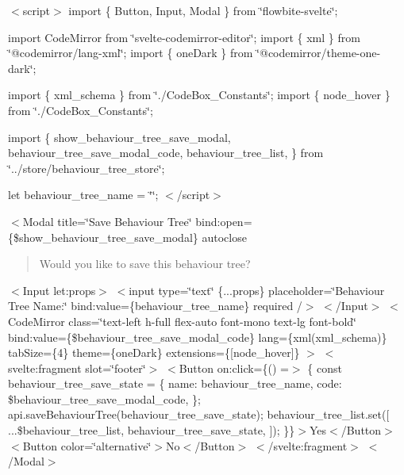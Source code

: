 $<$script$>$ import \{ Button, Input, Modal \} from \char`\"{}flowbite-\/svelte\char`\"{};

import Code\+Mirror from \char`\"{}svelte-\/codemirror-\/editor\char`\"{}; import \{ xml \} from \char`\"{}@codemirror/lang-\/xml\char`\"{}; import \{ one\+Dark \} from \char`\"{}@codemirror/theme-\/one-\/dark\char`\"{};

import \{ xml\+\_\+schema \} from \char`\"{}./\+Code\+Box\+\_\+\+Constants\char`\"{}; import \{ node\+\_\+hover \} from \char`\"{}./\+Code\+Box\+\_\+\+Constants\char`\"{};

import \{ show\+\_\+behaviour\+\_\+tree\+\_\+save\+\_\+modal, behaviour\+\_\+tree\+\_\+save\+\_\+modal\+\_\+code, behaviour\+\_\+tree\+\_\+list, \} from \char`\"{}../store/behaviour\+\_\+tree\+\_\+store\char`\"{};

let behaviour\+\_\+tree\+\_\+name = \char`\"{}\char`\"{}; $<$/script$>$

\texorpdfstring{$<$}{<}Modal title=\char`\"{}\+Save Behaviour Tree\char`\"{} bind\+:open=\{\$show\+\_\+behaviour\+\_\+tree\+\_\+save\+\_\+modal\} autoclose \begin{quote}
 

Would you like to save this behaviour tree? 

\end{quote}
$<$\+Input let\+:props$>$ \texorpdfstring{$<$}{<}input type=\char`\"{}text\char`\"{} \{...props\} placeholder=\char`\"{}\+Behaviour Tree Name\+:\char`\"{} bind\+:value=\{behaviour\+\_\+tree\+\_\+name\} required /\texorpdfstring{$>$}{>} $<$/\+Input$>$ $<$\+Code\+Mirror         class=\char`\"{}text-\/left h-\/full flex-\/auto font-\/mono text-\/lg font-\/bold\char`\"{}         bind\+:value=\{\$behaviour\+\_\+tree\+\_\+save\+\_\+modal\+\_\+code\}         lang=\{xml(xml\+\_\+schema)\}         tab\+Size=\{4\}         theme=\{one\+Dark\}         extensions=\{\mbox{[}node\+\_\+hover\mbox{]}\}     $>$ \texorpdfstring{$<$}{<}svelte\+:fragment slot=\char`\"{}footer\char`\"{}\texorpdfstring{$>$}{>} \texorpdfstring{$<$}{<}Button on\+:click=\{() =\texorpdfstring{$>$}{>} \{ const behaviour\+\_\+tree\+\_\+save\+\_\+state = \{ name\+: behaviour\+\_\+tree\+\_\+name, code\+: \$behaviour\+\_\+tree\+\_\+save\+\_\+modal\+\_\+code, \}; api.\+save\+Behaviour\+Tree(behaviour\+\_\+tree\+\_\+save\+\_\+state); behaviour\+\_\+tree\+\_\+list.\+set(\mbox{[} ...\$behaviour\+\_\+tree\+\_\+list, behaviour\+\_\+tree\+\_\+save\+\_\+state, \mbox{]}); \}\}\texorpdfstring{$>$}{>}Yes$<$/\+Button$>$ $<$\+Button color=\char`\"{}alternative\char`\"{}$>$No$<$/\+Button$>$ \texorpdfstring{$<$}{<}/svelte\+:fragment\texorpdfstring{$>$}{>} $<$/\+Modal$>$ 